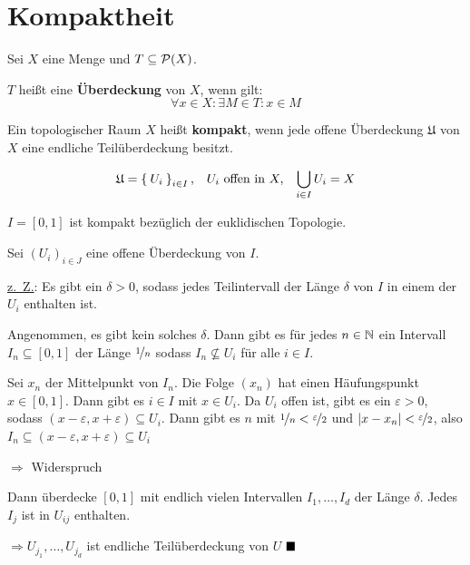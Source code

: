 \section{Kompaktheit}
\begin{definition}
    Sei $X$ eine Menge und $T \subseteq \mathcal{P}(X)$.

    $T$ heißt eine \textbf{Überdeckung} von $X$, wenn gilt:
    \[\forall x \in X: \exists M \in T: x \in M\]
\end{definition}

\begin{definition}
    Ein topologischer Raum $X$ heißt \textbf{kompakt}, wenn jede
    offene Überdeckung $\mathfrak{U}$ von $X$ eine endliche Teilüberdeckung besitzt.

    \[\mathfrak{U} = \Set{U_i}_{i \in I},\;\;\;U_i \text{ offen in } X,\;\;\;\bigcup_{i \in I} U_i = X\]
    
\end{definition}


\begin{korollar}\label{abgeschlossen01IstKompakt}
    $I = [0, 1]$ ist kompakt bezüglich der euklidischen Topologie.
\end{korollar}

\begin{beweis}
    Sei $(U_i)_{i \in J}$ eine offene Überdeckung von $I$.

\underline{z.~Z.}: Es gibt ein $\delta > 0$, sodass jedes Teilintervall
    der Länge $\delta$ von $I$ in einem der $U_i$ enthalten ist. 

Angenommen, es gibt kein solches $\delta$. Dann gibt es für jedes 
$n \in \mathbb{N}$ ein Intervall $I_n \subseteq [0,1]$ der Länge $\nicefrac{1}{n}$
sodass $I_n \not\subseteq U_i$ für alle $i \in I$.

Sei $x_n$ der Mittelpunkt von $I_n$. Die Folge $(x_n)$ hat einen 
Häufungspunkt $x \in [0,1]$. Dann gibt es $i \in I$ mit $x \in U_i$.
Da $U_i$ offen ist, gibt es ein $\varepsilon > 0$, sodass $(x - \varepsilon, x + \varepsilon) \subseteq U_i$.
Dann gibt es $n$ mit $\nicefrac{1}{n} < \nicefrac{\varepsilon}{2}$ und
$|x - x_n| < \nicefrac{\varepsilon}{2}$, also $I_n \subseteq (x - \varepsilon, x + \varepsilon) \subseteq U_i$

$\Rightarrow$ Widerspruch 

Dann überdecke $[0,1]$ mit endlich vielen Intervallen $I_1, \dots, I_d$
der Länge $\delta$. Jedes $I_j$ ist in $U_{ij}$ enthalten.

$\Rightarrow U_{j_1}, \dots, U_{j_d}$ ist endliche Teilüberdeckung von $U$
$\qed$
\end{beweis}

